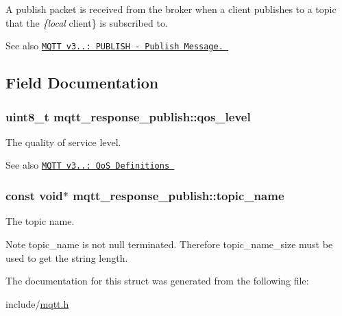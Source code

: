 A publish packet is received from the broker when a client publishes to a topic that the {\itshape \{local} client\} is subscribed to. 

\begin{DoxySeeAlso}{See also}
\href{http://docs.oasis-open.org/mqtt/mqtt/v3.1.1/os/mqtt-v3.1.1-os.html#_Toc398718037}{\tt M\+Q\+TT v3..\+: P\+U\+B\+L\+I\+SH -\/ Publish Message. } 
\end{DoxySeeAlso}


\subsection{Field Documentation}
\subsubsection[{\texorpdfstring{qos\+\_\+level}{qos_level}}]{\setlength{\rightskip}{0pt plus 5cm}uint8\+\_\+t mqtt\+\_\+response\+\_\+publish\+::qos\+\_\+level}\hypertarget{structmqtt__response__publish_ab6bc13774afcff002ce4f9afbee05493}{}\label{structmqtt__response__publish_ab6bc13774afcff002ce4f9afbee05493}


The quality of service level. 

\begin{DoxySeeAlso}{See also}
\href{http://docs.oasis-open.org/mqtt/mqtt/v3.1.1/os/mqtt-v3.1.1-os.html#_Table_3.11_-}{\tt M\+Q\+TT v3..\+: QoS Definitions } 
\end{DoxySeeAlso}
\subsubsection[{\texorpdfstring{topic\+\_\+name}{topic_name}}]{\setlength{\rightskip}{0pt plus 5cm}const void$\ast$ mqtt\+\_\+response\+\_\+publish\+::topic\+\_\+name}\hypertarget{structmqtt__response__publish_a5f35698c457c51f8099ff1d8f4198403}{}\label{structmqtt__response__publish_a5f35698c457c51f8099ff1d8f4198403}


The topic name. 

\begin{DoxyNote}{Note}
topic\+\_\+name is not null terminated. Therefore topic\+\_\+name\+\_\+size must be used to get the string length. 
\end{DoxyNote}


The documentation for this struct was generated from the following file\+:\begin{DoxyCompactItemize}
\item 
include/\hyperlink{mqtt_8h}{mqtt.\+h}\end{DoxyCompactItemize}
